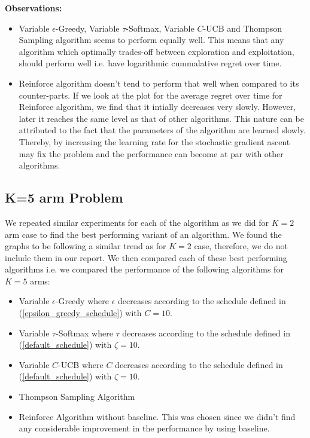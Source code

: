 \documentclass{article}
\begin{document}
		\textbf{Observations:}
		\begin{itemize}
			\item Variable $\epsilon$-Greedy, Variable $\tau$-Softmax, Variable $C$-UCB and Thompson Sampling algorithm seems to perform equally well. This means
				that any algorithm which optimally trades-off between exploration and exploitation, should perform well i.e. have logarithmic cummalative regret over 
				time.
			\item Reinforce algorithm doesn't tend to perform that well when compared to its counter-parts. If we look at the plot for the average regret over time
				for Reinforce algorithm, we find that it intially decreases very slowly. However, later it reaches the same level as that of other algorithms. This
				nature can be attributed to the fact that the parameters of the algorithm are learned slowly. Thereby, by increasing the learning rate for the 
				stochastic gradient ascent may fix the problem and the performance can become at par with other algorithms.	
		\end{itemize}
		
	\subsection{K=5 arm Problem}
		\label{5_bernoulli_comparison}
		We repeated similar experiments for each of the algorithm as we did for $K=2$ arm case to find the best performing variant of an algorithm. We found the 
		graphs to be following a similar trend as for $K=2$ case, therefore, we do not include them in our report. We then compared each of these best performing
		algorithms i.e. we compared the performance of the following algorithms for $K=5$ arms:
		\begin{itemize}
			\item Variable $\epsilon$-Greedy where $\epsilon$ decreases according to the schedule defined in (\ref{epsilon_greedy_schedule}) with $C=10$.
			\item Variable $\tau$-Softmax where $\tau$ decreases according to the schedule defined in (\ref{default_schedule}) with $\zeta=10$.
			\item Variable $C$-UCB where $C$ decreases according to the schedule defined in (\ref{default_schedule}) with $\zeta=10$.
			\item Thompson Sampling Algorithm
			\item Reinforce Algorithm without baseline. This was chosen since we didn't find any considerable improvement in the performance by using baseline.
		\end{itemize}
		
\end{document}
